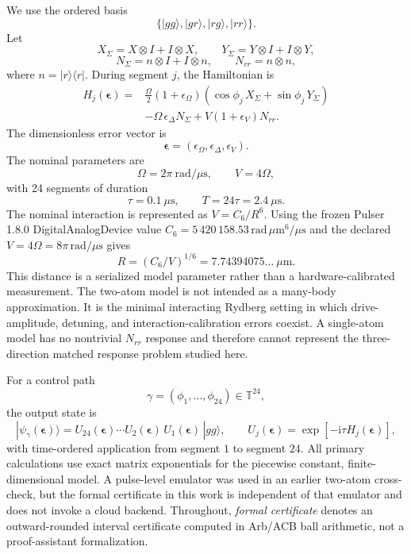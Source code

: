 \documentclass[11pt]{article}
\newcommand{\ii}{\mathrm{i}}
\begin{document}
We use the ordered basis
\[
\{|gg\rangle,|gr\rangle,|rg\rangle,|rr\rangle\}.
\]
Let
\[
X_\Sigma=X\otimes I+I\otimes X,\qquad
Y_\Sigma=Y\otimes I+I\otimes Y,
\]
\[
N_\Sigma=n\otimes I+I\otimes n,\qquad
N_{rr}=n\otimes n,
\]
where $n=|r\rangle\langle r|$. During segment $j$, the Hamiltonian is
\begin{align}
H_j(\boldsymbol{\epsilon})
={}&
\frac{\Omega}{2}(1+\epsilon_\Omega)
\left(\cos\phi_j\,X_\Sigma+\sin\phi_j\,Y_\Sigma\right)
\nonumber\\
&-\Omega\,\epsilon_\Delta N_\Sigma
+V(1+\epsilon_V)N_{rr}.
\label{eq:Hamiltonian}
\end{align}
The dimensionless error vector is
\[
\boldsymbol{\epsilon}
=(\epsilon_\Omega,\epsilon_\Delta,\epsilon_V).
\]
The nominal parameters are
\[
\Omega=2\pi~\mathrm{rad}/\mu\mathrm{s},\qquad
V=4\Omega,
\]
with 24 segments of duration
\[
\tau=0.1~\mu\mathrm{s},
\qquad
T=24\tau=2.4~\mu\mathrm{s}.
\]
The nominal interaction is represented as $V=C_6/R^6$. Using the frozen
Pulser 1.8.0 DigitalAnalogDevice value
$C_6=5\,420\,158.53\,\mathrm{rad}\,\mu\mathrm{m}^{6}/\mu\mathrm{s}$ and the
declared $V=4\Omega=8\pi\,\mathrm{rad}/\mu\mathrm{s}$ gives
\[
R=(C_6/V)^{1/6}=7.74394075\ldots~\mu\mathrm{m}.
\]
This distance is a serialized model parameter rather than a
hardware-calibrated measurement.
The two-atom model is not intended as a many-body approximation. It is the
minimal interacting Rydberg setting in which drive-amplitude, detuning, and
interaction-calibration errors coexist. A single-atom model has no nontrivial
$N_{rr}$ response and therefore cannot represent the three-direction matched
response problem studied here.

For a control path
\[
\gamma=(\phi_1,\ldots,\phi_{24})\in\mathbb{T}^{24},
\]
the output state is
\begin{equation}
|\psi_\gamma(\boldsymbol{\epsilon})\rangle
=
U_{24}(\boldsymbol{\epsilon})\cdots U_{2}(\boldsymbol{\epsilon})\,U_{1}(\boldsymbol{\epsilon})\,|gg\rangle,
\qquad
U_j(\boldsymbol{\epsilon})=\exp[-\ii\tau H_j(\boldsymbol{\epsilon})],
\label{eq:state}
\end{equation}
with time-ordered application from segment $1$ to segment $24$.
All primary calculations use exact matrix exponentials for the piecewise constant, finite-dimensional model. A pulse-level emulator was used in an earlier two-atom cross-check, but the formal certificate in this work is independent of that emulator and does not invoke a cloud backend. Throughout, \emph{formal certificate} denotes an outward-rounded interval certificate computed in Arb/ACB ball arithmetic, not a proof-assistant formalization.
\end{document}
